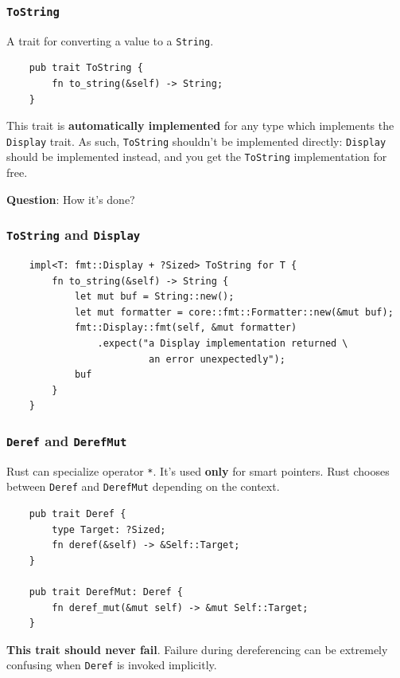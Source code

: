 \documentclass[aspectratio=1610,t]{beamer}
\begin{document}

\begin{frame}[fragile]
\frametitle{\texttt{ToString}}
A trait for converting a value to a \texttt{String}.

\begin{verbatim}
    pub trait ToString {
        fn to_string(&self) -> String;
    }
\end{verbatim}

This trait is \textbf{automatically implemented} for any type which implements the \texttt{Display} trait. As such, \texttt{ToString} shouldn’t be implemented directly: \texttt{Display} should be implemented instead, and you get the \texttt{ToString} implementation for free.

\textbf{Question}: How it's done?
\end{frame}


\begin{frame}[fragile]
\frametitle{\texttt{ToString} and \texttt{Display}}
\begin{verbatim}
    impl<T: fmt::Display + ?Sized> ToString for T {
        fn to_string(&self) -> String {
            let mut buf = String::new();
            let mut formatter = core::fmt::Formatter::new(&mut buf);
            fmt::Display::fmt(self, &mut formatter)
                .expect("a Display implementation returned \
                         an error unexpectedly");
            buf
        }
    }
\end{verbatim}
\end{frame}


\begin{frame}[fragile]
\frametitle{\texttt{Deref} and \texttt{DerefMut}}
Rust can specialize operator \texttt{*}. It's used \textbf{only} for smart pointers. Rust chooses between \texttt{Deref} and \texttt{DerefMut} depending on the context.

\begin{verbatim}
    pub trait Deref {
        type Target: ?Sized;
        fn deref(&self) -> &Self::Target;
    }

    pub trait DerefMut: Deref {
        fn deref_mut(&mut self) -> &mut Self::Target;
    }
\end{verbatim}

\textbf{This trait should never fail}. Failure during dereferencing can be extremely confusing when \texttt{Deref} is invoked implicitly.
\end{frame}
\end{document}
